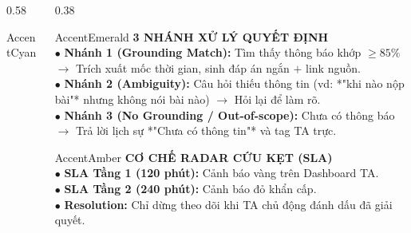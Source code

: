 \documentclass[aspectratio=169,10pt]{beamer}
\begin{document}
\begin{frame}
\begin{columns}[T]
\begin{column}{0.58\textwidth}
\begin{glassbox}{AccentCyan}
      \end{glassbox}
    \end{column}

    \begin{column}{0.38\textwidth}
      \begin{glassbox}{AccentEmerald}
        {\scriptsize \textbf{\color{AccentEmerald}3 NHÁNH XỬ LÝ QUYẾT ĐỊNH}}\\[0.1cm]
        \tiny
        $\bullet$ \textbf{Nhánh 1 (Grounding Match):} Tìm thấy thông báo khớp $\ge 85\%$ $\rightarrow$ Trích xuất mốc thời gian, sinh đáp án ngắn $+$ link nguồn.\\[0.1cm]
        $\bullet$ \textbf{Nhánh 2 (Ambiguity):} Câu hỏi thiếu thông tin (vd: *"khi nào nộp bài"* nhưng không nói bài nào) $\rightarrow$ Hỏi lại để làm rõ.\\[0.1cm]
        $\bullet$ \textbf{Nhánh 3 (No Grounding / Out-of-scope):} Chưa có thông báo $\rightarrow$ Trả lời lịch sự *"Chưa có thông tin"* và tag TA trực.
      \end{glassbox}

      \vspace{0.15cm}
      \begin{glassbox}{AccentAmber}
        {\scriptsize \textbf{\color{AccentAmber}CƠ CHẾ RADAR CỨU KẸT (SLA)}}\\[0.1cm]
        \tiny
        $\bullet$ \textbf{SLA Tầng 1 (120 phút):} Cảnh báo vàng trên Dashboard TA.\\[0.05cm]
        $\bullet$ \textbf{SLA Tầng 2 (240 phút):} Cảnh báo đỏ khẩn cấp.\\[0.05cm]
        $\bullet$ \textbf{Resolution:} Chỉ dừng theo dõi khi TA chủ động đánh dấu đã giải quyết.
      \end{glassbox}
    \end{column}
  \end{columns}
\end{frame}
\end{document}
